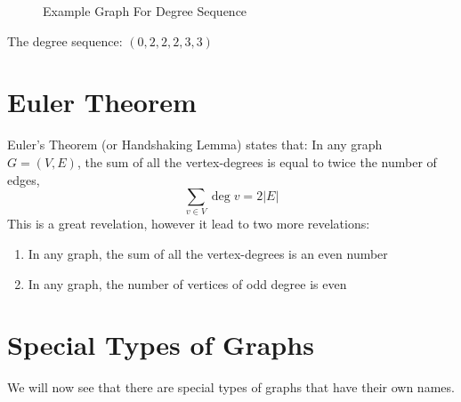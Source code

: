 \begin{minipage}{0.5\textwidth}
    \begin{figure}[H]
        \centering
        \caption{Example Graph For Degree Sequence}
    \end{figure}
\end{minipage} \hfill
\begin{minipage}{0.45\textwidth}
The degree sequence: $(0, 2, 2, 2, 3, 3)$
\end{minipage}

\section{Euler Theorem}
Euler's Theorem (or Handshaking Lemma) states that: In any graph $G = (V,E)$, the sum of all the vertex-degrees is equal to twice the number of edges,
\[\sum_{v \in V} \deg v = 2|E|\]
This is a great revelation, however it lead to two more revelations:
\begin{enumerate}
    \item In any graph, the sum of all the vertex-degrees is an even number
    \item In any graph, the number of vertices of odd degree is even
\end{enumerate}

\section{Special Types of Graphs}
We will now see that there are special types of graphs that have their own names.
